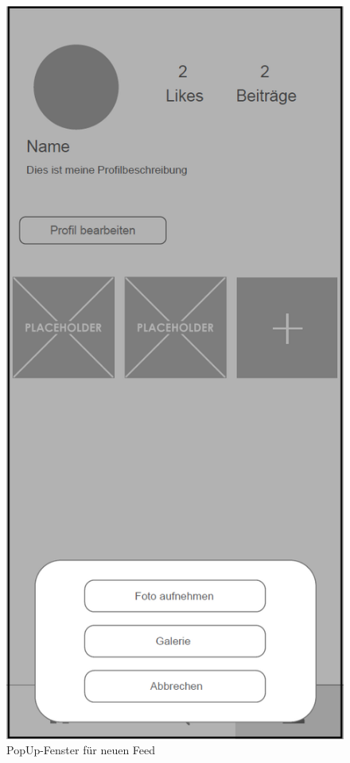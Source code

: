 \begin{figure}[H]
    \centering
    \begin{minipage}{.5\textwidth}
      \centering
      \includegraphics[width=.8\linewidth]{images/PopUp_Photo_MockUp.png}
      \caption{PopUp-Fenster für neuen Feed}
      \label{fig:popup_new_feed}
    \end{minipage}%
    \begin{minipage}{.5\textwidth}
      \centering

\end{minipage}
\end{figure}
